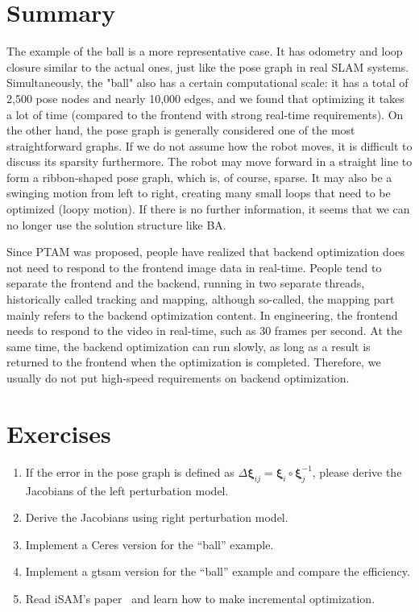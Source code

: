 \section{Summary}
The example of the ball is a more representative case. It has odometry and loop closure similar to the actual ones, just like the pose graph in real SLAM systems. Simultaneously, the "ball" also has a certain computational scale: it has a total of 2,500 pose nodes and nearly 10,000 edges, and we found that optimizing it takes a lot of time (compared to the frontend with strong real-time requirements). On the other hand, the pose graph is generally considered one of the most straightforward graphs. If we do not assume how the robot moves, it is difficult to discuss its sparsity furthermore. The robot may move forward in a straight line to form a ribbon-shaped pose graph, which is, of course, sparse. It may also be a swinging motion from left to right, creating many small loops that need to be optimized (loopy motion). If there is no further information, it seems that we can no longer use the solution structure like BA.

Since PTAM\textsuperscript{\cite{Klein2007}} was proposed, people have realized that backend optimization does not need to respond to the frontend image data in real-time. People tend to separate the frontend and the backend, running in two separate threads, historically called tracking and mapping, although so-called, the mapping part mainly refers to the backend optimization content. In engineering, the frontend needs to respond to the video in real-time, such as 30 frames per second. At the same time, the backend optimization can run slowly, as long as a result is returned to the frontend when the optimization is completed. Therefore, we usually do not put high-speed requirements on backend optimization.

\section*{Exercises}
\begin{enumerate}
	\item If the error in the pose graph is defined as $\Delta \bm{\xi}_{ij} = \bm{\xi}_i \circ \bm{\xi}_j^{-1}$, please derive the Jacobians of the left perturbation model.
	\item Derive the Jacobians using right perturbation model. 
	\item Implement a Ceres version for the ``ball'' example. 
	\item Implement a gtsam version for the ``ball'' example and compare the efficiency. 
	\item[\optional] Read iSAM's paper~\cite{Kaess2008,Kaess2011} and learn how to make incremental optimization.
\end{enumerate}


